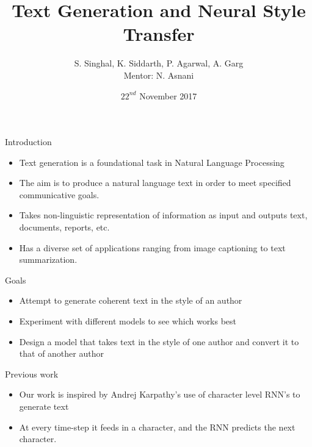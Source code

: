 \documentclass{beamer}
\title[]{Text Generation and Neural Style Transfer}
\author{S. Singhal, K. Siddarth, P. Agarwal, A. Garg \\ Mentor: N. Asnani}
\institute{Department of Computer Science and Engineering\\ IIT Kanpur}
\date{$22^{nd}$ November 2017}
\begin{document}
\begin{frame}
  \titlepage
\end{frame}


\begin{frame}{Introduction}
\begin{itemize}
  \item Text generation is a foundational task in Natural Language Processing
  \item The aim is to produce a natural language text in order to meet specified communicative goals.
  \item Takes non-linguistic representation of information as input and outputs text, documents, reports, etc.
  \item Has a diverse set of applications ranging from image captioning to text summarization.
\end{itemize}
\end{frame}
\begin{frame}{Goals}
	\begin{itemize}
	\item Attempt to generate coherent text in the style of an author
    \item Experiment with different models to see which works best
    \item Design a model that takes text in the style of one author and convert it to that of another author 
	\end{itemize}
\end{frame}

\begin{frame}{Previous work}
\begin{itemize}
\item Our work is inspired by Andrej Karpathy's use of character level RNN's to generate text
\item At every time-step it feeds in a character, and the RNN predicts the next character.
\end{itemize}
\end{frame}
\end{document}
